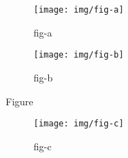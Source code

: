 \begin{figure}[!htb]
    \centering
    \begin{subfigure}[!htb]{\textwidth}
        \centering
        \texttt{[image: img/fig-a]}
        \caption{fig-a\\\hspace{\textwidth}}\label{fig:fig-a}
    \end{subfigure}
    \begin{subfigure}[!htb]{\textwidth}
        \centering
        \texttt{[image: img/fig-b]}
        \caption{fig-b\\}\label{fig:fig-b}
    \end{subfigure}
    \caption{Figure}
    \label{fig:fig}
\end{figure}
\begin{figure}[!htb]\ContinuedFloat    
    \begin{subfigure}[!htb]{\textwidth}
        \centering
        \texttt{[image: img/fig-c]}
        \caption{fig-c}\label{fig:fig-c}
    \end{subfigure}
    \renewcommand{\thefigure}{\arabic{figure} (Cont.)}
    \caption{}
    \renewcommand{\thefigure}{\arabic{figure}}
\end{figure} 



